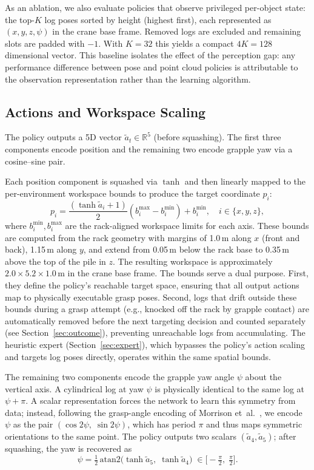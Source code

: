 \documentclass[conference]{IEEEtran}
\begin{document}
As an ablation, we also evaluate policies that observe privileged per-object state: the top-$K$ log poses sorted by height (highest first), each represented as $(x,y,z,\psi)$ in the crane base frame.
Removed logs are excluded and remaining slots are padded with $-1$.
With $K\!=\!32$ this yields a compact $4K = 128$ dimensional vector.
This baseline isolates the effect of the perception gap: any performance difference between pose and point cloud policies is attributable to the observation representation rather than the learning algorithm.

\subsection{Actions and Workspace Scaling}
\label{sec:actions}
The policy outputs a 5D vector $\tilde{a}_t \in \mathbb{R}^5$ (before squashing).
The first three components encode position and the remaining two encode grapple yaw via a cosine--sine pair.

Each position component is squashed via $\tanh$ and then linearly mapped to the per-environment workspace bounds to produce the target coordinate $p_i$:
\begin{equation}
    p_i = \frac{(\tanh \tilde{a}_i + 1)}{2}(b_i^{\max} - b_i^{\min}) + b_i^{\min}, \quad i \in \{x,y,z\},
\end{equation}
where $b_i^{\min}, b_i^{\max}$ are the rack-aligned workspace limits for each axis.
These bounds are computed from the rack geometry with margins of 1.0\,m along $x$ (front and back), 1.15\,m along $y$, and extend from 0.05\,m below the rack base to 0.35\,m above the top of the pile in $z$.
The resulting workspace is approximately $2.0 \times 5.2 \times 1.0$\,m in the crane base frame.
The bounds serve a dual purpose.
First, they define the policy's reachable target space, ensuring that all output actions map to physically executable grasp poses.
Second, logs that drift outside these bounds during a grasp attempt (e.g., knocked off the rack by grapple contact) are automatically removed before the next targeting decision and counted separately (see Section~\ref{sec:outcome}), preventing unreachable logs from accumulating.
The heuristic expert (Section~\ref{sec:expert}), which bypasses the policy's action scaling and targets log poses directly, operates within the same spatial bounds.

The remaining two components encode the grapple yaw angle $\psi$ about the vertical axis.
A cylindrical log at yaw $\psi$ is physically identical to the same log at $\psi + \pi$.
A scalar representation forces the network to learn this symmetry from data; instead, following the grasp-angle encoding of Morrison et~al.~\cite{morrison2018closing}, we encode $\psi$ as the pair $(\cos 2\psi,\;\sin 2\psi)$, which has period $\pi$ and thus maps symmetric orientations to the same point.
The policy outputs two scalars $(\tilde{a}_4, \tilde{a}_5)$; after squashing, the yaw is recovered as
\begin{equation}
    \psi = \tfrac{1}{2}\,\mathrm{atan2}\!\big(\tanh \tilde{a}_5,\;\tanh \tilde{a}_4\big) \;\in \big[-\tfrac{\pi}{2},\;\tfrac{\pi}{2}\big].
\end{equation}
\end{document}
